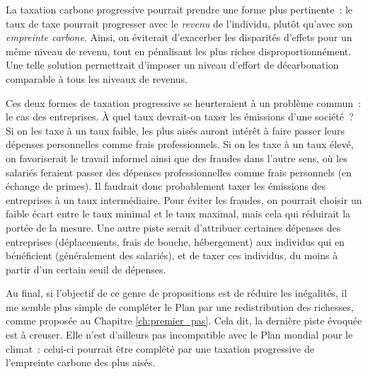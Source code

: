 \documentclass[a5paper,french]{memoir}
\begin{document}
La taxation carbone progressive pourrait prendre une forme plus pertinente~: le taux de taxe pourrait progresser avec le \textit{revenu} de l'individu, plutôt qu'avec son \textit{empreinte carbone}. Ainsi, on éviterait d'exacerber les disparités d'effets pour un même niveau de revenu, tout en pénalisant les plus riches disproportionnément. Une telle solution permettrait d'imposer un niveau d'effort de décarbonation comparable à tous les niveaux de revenus. 

Ces deux formes de taxation progressive se heurteraient à un problème commun~: le cas des entreprises. À quel taux devrait-on taxer les émissions d'une société~? Si on les taxe à un taux faible, les plus aisés auront intérêt à faire passer leurs dépenses personnelles comme frais professionnels. Si on les taxe à un taux élevé, on favoriserait le travail informel ainsi que des fraudes dans l'autre sens, où les salariés feraient passer des dépenses professionnelles comme frais personnels (en échange de primes). Il faudrait donc probablement taxer les émissions des entreprises à un taux intermédiaire. Pour éviter les fraudes, on pourrait choisir un faible écart entre le taux minimal et le taux maximal, mais cela qui réduirait la portée de la mesure. Une autre piste serait d'attribuer certaines dépenses des entreprises (déplacements, frais de bouche, hébergement) aux individus qui en bénéficient (généralement des salariés), et de taxer ces individus, du moins à partir d'un certain seuil de dépenses. 

Au final, si l'objectif de ce genre de propositions est de réduire les inégalités, il me semble plus simple de compléter le Plan par une redistribution des richesses, comme proposée au Chapitre \ref{ch:premier_pas}. Cela dit, la dernière piste évoquée est à creuser. Elle n'est d'ailleurs pas incompatible avec le Plan mondial pour le climat~: celui-ci pourrait être complété par une taxation progressive de l'empreinte carbone des plus aisés. 
\end{document}
